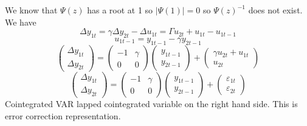 \documentclass[11pt, a4paper, oneside]{article}
\theoremstyle{definition}
\theoremstyle{proposition}
\theoremstyle{corollary}
\theoremstyle{lemma}
\theoremstyle{theorem}
\begin{document}
We know that $\Psi(z)$ has a root at 1 so $|\Psi(1)| = 0$ so $\Psi(z)^{-1}$ does not exist. We have
$$\Delta y_{1t} = \gamma \Delta y_{2t} -\Delta u_{1t} = \Gamma u_{2t} + u_{1t} - u_{1t -1}$$ 
$$u_{1t-1} = y_{1t-1} - \gamma y_{2t-1}$$ 
$$\begin{pmatrix}\Delta y_{1t} \\\Delta y_{2t} \end{pmatrix} = \begin{pmatrix} -1 & \gamma \\ 0 & 0 \end{pmatrix} \begin{pmatrix} y_{1t-1} \\  y_{2t-1} \end{pmatrix} + \begin{pmatrix} \gamma u_{2t} + u_{1t} \\ u_{2t} \end{pmatrix}$$
$$\begin{pmatrix}\Delta y_{1t} \\\Delta y_{2t} \end{pmatrix} = \begin{pmatrix} -1 & \gamma \\ 0 & 0 \end{pmatrix} \begin{pmatrix} y_{1t-1} \\  y_{2t-1} \end{pmatrix} + \begin{pmatrix} \varepsilon_{1t} \\  \varepsilon_{2t} \end{pmatrix}$$
Cointegrated VAR lapped cointegrated variable on the right hand side. This is error correction representation. 
\end{document}
